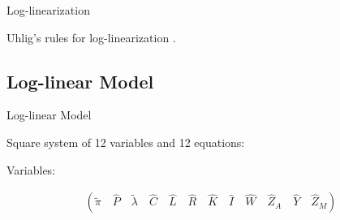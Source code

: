 \documentclass[
presentation.tex
]{subfiles}
\begin{document}

\begin{frame}{Log-linearization}
	
	Uhlig's rules for log-linearization \cite{uhlig_toolkit_1999}.
	
\end{frame}


\subsection{Log-linear Model}

\begin{frame}[allowframebreaks]{Log-linear Model}

	Square system of 12 variables and 12 equations:
	
	Variables:
	
	\begin{align}
		\left( \tilde{\pi} \quad \hat{P} \quad \tilde{\lambda} \quad \hat{C} \quad \hat{L} \quad \hat{R} \quad \hat{K} \quad \hat{I} \quad \hat{W} \quad \hat{Z}_A \quad \hat{Y} \quad \hat{Z}_M \right)
	\end{align}
	
\end{frame}

\end{document}
